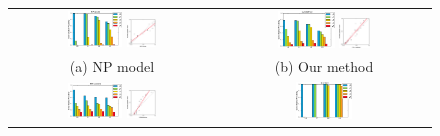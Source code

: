 \begin{figure}[t]
    \centering
    \begin{tabular}{cc}
        \includegraphics[width=0.28\textwidth]{figs/vcl/per_level_response_np.pdf}
        \includegraphics[width=0.15\textwidth]{figs/vcl/correlation_np.pdf} &
        \includegraphics[width=0.28\textwidth]{figs/vcl/per_level_response_vg.pdf}
        \includegraphics[width=0.15\textwidth]{figs/vcl/correlation_vg.pdf}\\
        (a) NP model & (b) Our method \\
        \includegraphics[width=0.28\textwidth]{figs/vcl/per_level_response_pm.pdf}
        \includegraphics[width=0.15\textwidth]{figs/vcl/correlation_pm.pdf} &
        \includegraphics[width=0.28\textwidth]{figs/vcl/per_level_response_ic.pdf}

\end{tabular}
\end{figure}
